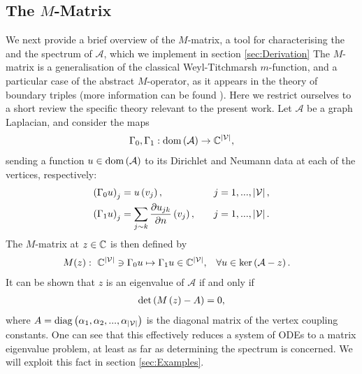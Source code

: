 \subsection{The $M$-Matrix} \label{ssec:MMatrix}
We next provide a brief overview of the $M$-matrix, a tool for characterising the  and the spectrum of $\mathcal{A}$, which we implement in section \ref{sec:Derivation}
The $M$-matrix is a generalisation of the classical Weyl-Titchmarsh $m$-function, and a particular case of the abstract $M$-operator, as it appears in the theory of boundary triples (more information can be found ).
Here we restrict ourselves to a short review the specific theory relevant to the present work.
Let $\mathcal{A}$ be a graph Laplacian, and consider the maps
\begin{align*}
	\Gamma_0, \Gamma_1: \mathrm{dom}\left( \mathcal{A} \right) \rightarrow \mathbb{C}^{\left\lvert \mathcal{V} \right\rvert},
\end{align*}
sending a function $u\in\mathrm{dom}\left( \mathcal{A} \right)$ to its Dirichlet and Neumann data at each of the vertices, respectively:
\begin{align*}
	\left( \Gamma_0 u \right)_j &= u\left( v_j \right), \quad &j=1,...,\left\lvert \mathcal{V} \right\rvert, \\
	\left( \Gamma_1 u \right)_j &= \sum_{j\sim k}\dfrac{\partial u_{jk}}{\partial n}\left( v_j \right), \quad &j=1,...,\left\lvert \mathcal{V} \right\rvert. 
\end{align*}
The $M$-matrix at $z\in\mathbb{C}$ is then defined by
\begin{align*}
	M(z): \ \mathbb{C}^{\left\lvert \mathcal{V} \right\rvert} \ni \Gamma_0 u \mapsto \Gamma_1 u \in \mathbb{C}^{\left\lvert \mathcal{V} \right\rvert},
	 &\quad \forall u\in\mathrm{ker}\left( \mathcal{A}-z \right).
\end{align*}
It can be shown that $z$ is an eigenvalue of $\mathcal{A}$ if and only if
\begin{align*}
	\mathrm{det}\left( M\left( z \right) - A \right)= 0,
\end{align*}
where $A = \mathrm{diag}\left( \alpha_1, \alpha_2, ... , \alpha_{\left\lvert \mathcal{V} \right\rvert} \right)$ is the diagonal matrix of the vertex coupling constants.
One can see that this effectively reduces a system of ODEs to a matrix eigenvalue problem, at least as far as determining the spectrum is concerned.
We will exploit this fact in section \ref{sec:Examples}.

